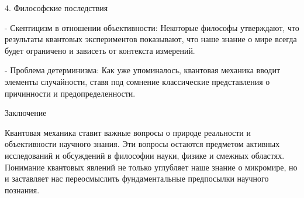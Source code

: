 \documentclass[exam_answers.tex]{subfiles}
\begin{document}
4. Философские последствия

- Скептицизм в отношении объективности: Некоторые философы утверждают, что результаты квантовых экспериментов показывают, что наше знание о мире всегда будет ограничено и зависеть от контекста измерений.

- Проблема детерминизма: Как уже упоминалось, квантовая механика вводит элементы случайности, ставя под сомнение классические представления о причинности и предопределенности.

Заключение

Квантовая механика ставит важные вопросы о природе реальности и объективности научного знания.
Эти вопросы остаются предметом активных исследований и обсуждений в философии науки, физике и смежных областях.
Понимание квантовых явлений не только углубляет наше знание о микромире, но и заставляет нас переосмыслить фундаментальные предпосылки научного познания.
\end{document}
